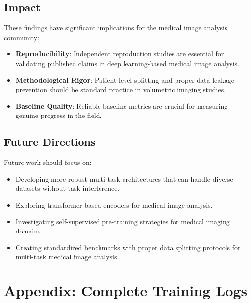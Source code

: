 \documentclass[11pt,a4paper,twoside]{report}
\begin{document}
\section{Impact}

These findings have significant implications for the medical image analysis community:

\begin{itemize}
    \item \textbf{Reproducibility}: Independent reproduction studies are essential for validating published claims in deep learning-based medical image analysis.
    \item \textbf{Methodological Rigor}: Patient-level splitting and proper data leakage prevention should be standard practice in volumetric imaging studies.
    \item \textbf{Baseline Quality}: Reliable baseline metrics are crucial for measuring genuine progress in the field.
\end{itemize}

\section{Future Directions}

Future work should focus on:

\begin{itemize}
    \item Developing more robust multi-task architectures that can handle diverse datasets without task interference.
    \item Exploring transformer-based encoders for medical image analysis.
    \item Investigating self-supervised pre-training strategies for medical imaging domains.
    \item Creating standardized benchmarks with proper data splitting protocols for multi-task medical image analysis.
\end{itemize}




\appendix
\chapter{Appendix: Complete Training Logs}
\end{document}
